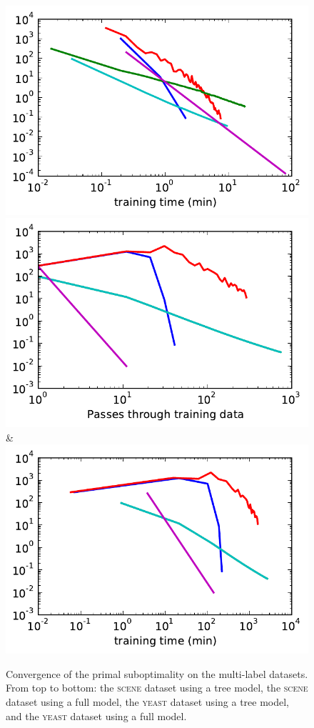 \begin{figure}
\begin{tabu}
    \includegraphics[width=\linewidth]{evaluation/images/yeast_tree_log_time}\\
    \includegraphics[width=\linewidth]{evaluation/images/yeast_full}&%
    \includegraphics[width=\linewidth]{evaluation/images/yeast_full_time}
    \end{tabu}
\caption{%
   Convergence of the primal suboptimality on the multi-label datasets. From top to
   bottom: the \textsc{scene} dataset using a tree model, the \textsc{scene} dataset using a full
   model, the \textsc{yeast} dataset using a tree model, and the \textsc{yeast} dataset using a
   full model.
}
\end{figure}

